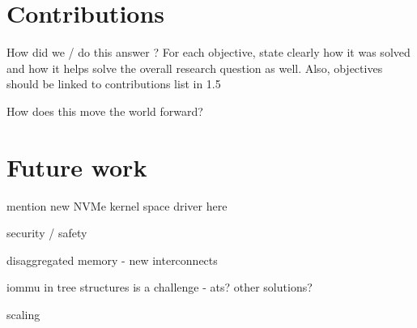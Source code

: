 


\section{Contributions}\label{sec:concl}

How did we / do this answer ?
For each objective, state clearly how it was solved and how it helps solve the overall research question as well.
%
Also, objectives should be linked to contributions list in 1.5

How does this move the world forward?


%

\section{Future work}\label{sec:fw}

mention new NVMe kernel space driver here

security / safety

disaggregated memory - new interconnects

iommu in tree structures is a challenge - ats? other solutions?


scaling





%
%

